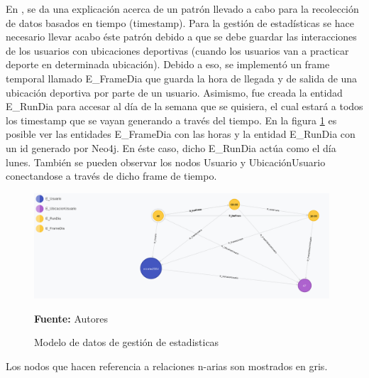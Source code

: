 En \cite{dependent_time_graphs}, se da una explicación acerca de un patrón llevado a cabo para la recolección de datos basados en tiempo (timestamp). Para la gestión de estadísticas se hace necesario llevar acabo éste patrón debido a que se debe guardar las interacciones de los usuarios con ubicaciones deportivas (cuando los usuarios van a practicar deporte en determinada ubicación). Debido a eso, se implementó un frame temporal llamado E\_FrameDia que guarda la hora de llegada y de salida de una ubicación deportiva por parte de un usuario. Asimismo, fue creada la entidad E\_RunDia para accesar al día de la semana que se quisiera, el cual estará a todos los timestamp que se vayan generando a través del tiempo. En la figura \ref{fig:modelo_datos_gestion_estadisticas} es posible ver las entidades E\_FrameDia con las horas y la entidad E\_RunDia con un id generado por Neo4j. En éste caso, dicho E\_RunDia actúa como el día lunes. También se pueden observar los nodos Usuario y UbicaciónUsuario conectandose a través de dicho frame de tiempo.

\begin{figure}[!htb]
  \begin{center}
    \includegraphics[width=11cm]{./imagenes/Modelo_de_datos/Gestion_estadisticas.png}
    \caption{Modelo de datos de gestión de estadisticas}
    \label{fig:modelo_datos_gestion_estadisticas}
    \textbf{Fuente:}  Autores
  \end{center}
\end{figure}

Los nodos que hacen referencia a relaciones n-arias son mostrados en gris.